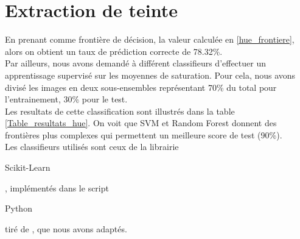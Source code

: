 \documentclass{book}
\begin{document}
\section{Extraction de teinte}
En prenant comme frontière de décision, la valeur calculée en \ref{hue_frontiere}, alors on obtient un taux de prédiction correcte de 78.32\%.\\
Par ailleurs, nous avons demandé à différent classifieurs d'effectuer un apprentissage supervisé sur les moyennes de saturation. Pour cela, nous avons divisé les images
en deux sous-ensembles représentant 70\% du total pour l'entrainement, 30\% pour le test.\\
Les resultats de cette classification sont illustrés dans la table \ref{Table_resultats_hue}. On voit que SVM et Random Forest donnent des frontières plus complexes qui permettent
un meilleure score de test (90\%).\\
Les classifieurs utilisés sont ceux de la librairie \begin{itshape}Scikit-Learn\end{itshape}, implémentés dans le script 
\begin{itshape}Python\end{itshape} tiré de \cite{scikit_bench}, que nous avons adaptés.
\end{document}
